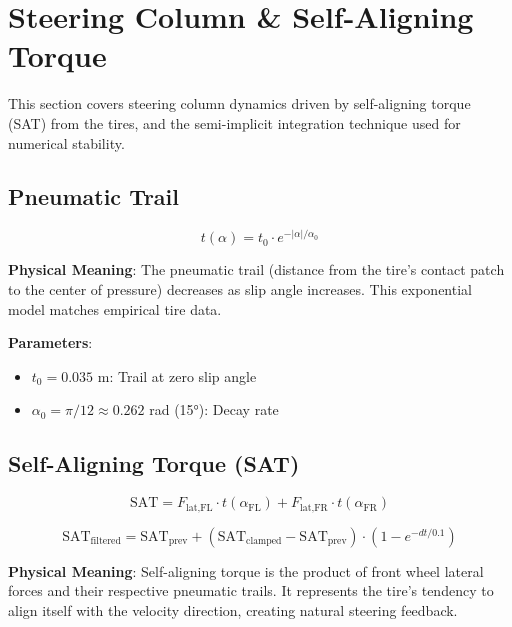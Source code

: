 \section{Steering Column \& Self-Aligning Torque}

This section covers steering column dynamics driven by self-aligning torque (SAT) from the tires, and the semi-implicit integration technique used for numerical stability.

\subsection{Pneumatic Trail}

\begin{equation}
  t(\alpha) = t_0 \cdot e^{-|\alpha| / \alpha_0}
  \label{eq:pneumatic-trail}
\end{equation}

\textbf{Physical Meaning}: The pneumatic trail (distance from the tire's contact patch to the center of pressure) decreases as slip angle increases. This exponential model matches empirical tire data.

\textbf{Parameters}:
\begin{itemize}
  \item $t_0 = 0.035$ m: Trail at zero slip angle
  \item $\alpha_0 = \pi/12 \approx 0.262$ rad (15°): Decay rate
\end{itemize}

\subsection{Self-Aligning Torque (SAT)}

\begin{equation}
  \text{SAT} = F_{\text{lat,FL}} \cdot t(\alpha_{\text{FL}}) + F_{\text{lat,FR}} \cdot t(\alpha_{\text{FR}})
  \label{eq:sat-raw}
\end{equation}

\begin{equation}
  \text{SAT}_{\text{filtered}} = \text{SAT}_{\text{prev}} + (\text{SAT}_{\text{clamped}} - \text{SAT}_{\text{prev}}) \cdot (1 - e^{-dt/0.1})
  \label{eq:sat-filtered}
\end{equation}

\textbf{Physical Meaning}: Self-aligning torque is the product of front wheel lateral forces and their respective pneumatic trails. It represents the tire's tendency to align itself with the velocity direction, creating natural steering feedback.

